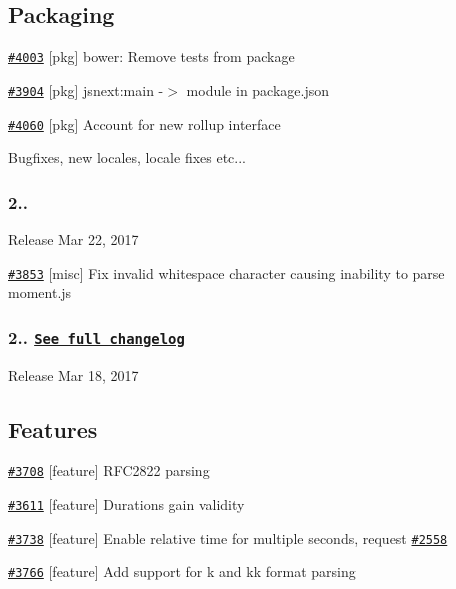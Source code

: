\subsection*{Packaging}


\begin{DoxyItemize}
\item \href{https://github.com/moment/moment/pull/4003}{\tt \#4003} \mbox{[}pkg\mbox{]} bower\+: Remove tests from package
\item \href{https://github.com/moment/moment/pull/3904}{\tt \#3904} \mbox{[}pkg\mbox{]} jsnext\+:main -\/$>$ module in package.\+json
\item \href{https://github.com/moment/moment/pull/4060}{\tt \#4060} \mbox{[}pkg\mbox{]} Account for new rollup interface
\end{DoxyItemize}

Bugfixes, new locales, locale fixes etc...

\subsubsection*{2..}


\begin{DoxyItemize}
\item Release Mar 22, 2017
\item \href{https://github.com/moment/moment/pull/3853}{\tt \#3853} \mbox{[}misc\mbox{]} Fix invalid whitespace character causing inability to parse moment.\+js
\end{DoxyItemize}

\subsubsection*{2.. \href{https://gist.github.com/ichernev/78920c5a1e419fb28c6e4546d1b7235c}{\tt See full changelog}}


\begin{DoxyItemize}
\item Release Mar 18, 2017
\end{DoxyItemize}

\subsection*{Features}


\begin{DoxyItemize}
\item \href{https://github.com/moment/moment/pull/3708}{\tt \#3708} \mbox{[}feature\mbox{]} R\+F\+C2822 parsing
\item \href{https://github.com/moment/moment/pull/3611}{\tt \#3611} \mbox{[}feature\mbox{]} Durations gain validity
\item \href{https://github.com/moment/moment/pull/3738}{\tt \#3738} \mbox{[}feature\mbox{]} Enable relative time for multiple seconds, request \href{https://github.com/moment/moment/issues/2558}{\tt \#2558}
\item \href{https://github.com/moment/moment/pull/3766}{\tt \#3766} \mbox{[}feature\mbox{]} Add support for k and kk format parsing
\end{DoxyItemize}

